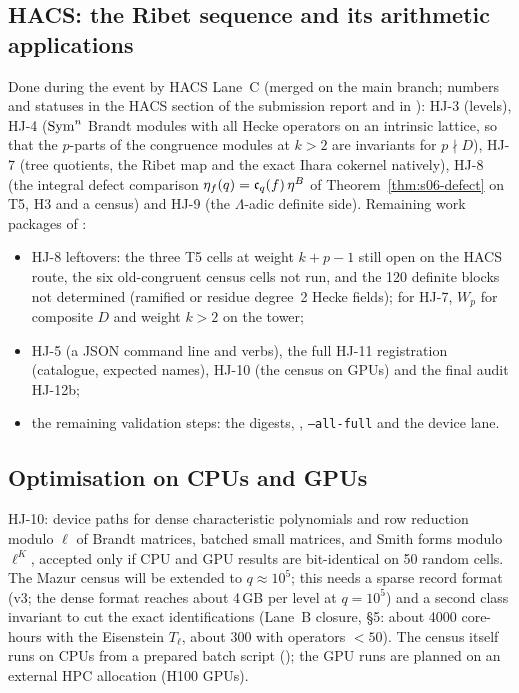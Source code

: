 \subsection{HACS: the Ribet sequence and its arithmetic applications}\label{ss:stage2-hacs}
Done during the event by HACS Lane~C (merged on the main branch; numbers and statuses in the HACS section of the submission
report and in ): HJ-3 (levels), HJ-4 ($\mathrm{Sym}^n$ Brandt modules with all
Hecke operators on an intrinsic lattice, so that the $p$-parts of the congruence modules at $k>2$ are invariants for $p\nmid D$), HJ-7 (tree quotients, the Ribet
map and the exact Ihara cokernel natively), HJ-8 (the integral defect comparison $\eta_f(q)=\mathfrak{c}_q(f)\,\eta^B$ of
Theorem~\ref{thm:s06-defect} on T5, H3 and a census) and HJ-9 (the $\Lambda$-adic definite side). Remaining work packages of
:
\begin{itemize}
\item HJ-8 leftovers: the three T5 cells at weight $k+p-1$ still open on the HACS route, the six old-congruent census cells not run, and the 120 definite
  blocks not determined (ramified or residue degree~2 Hecke fields); for HJ-7, $W_p$ for composite $D$ and weight $k>2$ on the tower;
\item HJ-5 (a JSON command line and verbs), the full HJ-11 registration (catalogue, expected names), HJ-10 (the census on GPUs) and
  the final audit HJ-12b;
\item the remaining validation steps: the digests, , \texttt{--all-full} and the device lane.
\end{itemize}

\subsection{Optimisation on CPUs and GPUs}\label{ss:stage2-gpu}
HJ-10: device paths for dense characteristic polynomials and row reduction modulo $\ell$ of Brandt matrices, batched small
matrices, and Smith forms modulo $\ell^K$, accepted only if CPU and GPU results are bit-identical on 50 random cells. The Mazur
census will be extended to $q\approx10^5$; this needs a sparse record format (v3; the dense format reaches about 4\,GB per
level at $q=10^5$) and a second class invariant to cut the exact identifications (Lane~B closure, \S5: about 4000 core-hours
with the Eisenstein $T_\ell$, about 300 with operators $<50$). The census itself runs on CPUs from a prepared batch script
(); the GPU runs are planned on an external HPC allocation (H100 GPUs).

